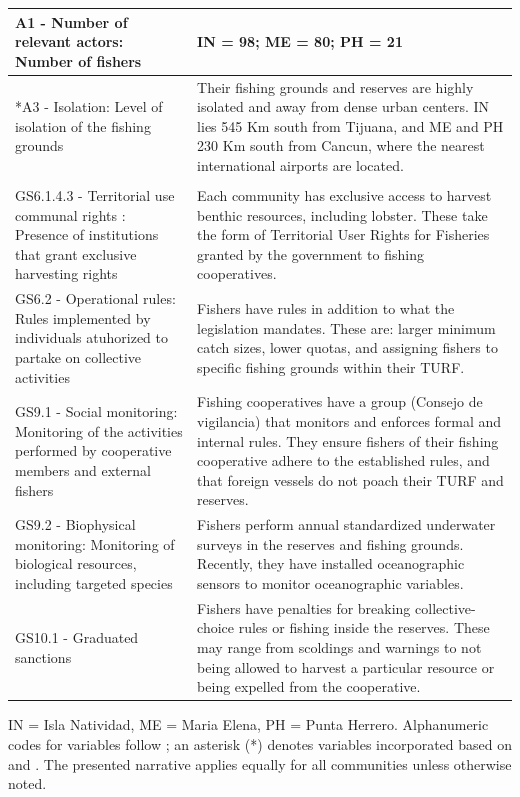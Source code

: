 \documentclass[10pt,letterpaper]{article}
\begin{document}
\begin{table}[!ht]
{\begin{tabular}{>{\raggedright\arraybackslash}p{6.5cm}|>{\raggedright\arraybackslash}p{12.2cm}}
\hline
\hspace{1em}A1 - Number of relevant actors: Number of fishers & IN = 98; ME = 80; PH = 21\\
\hline
\hspace{1em}*A3 - Isolation: Level of isolation of the fishing grounds & Their fishing grounds and reserves are highly isolated and away from dense urban centers. IN lies 545 Km south from Tijuana, and ME and PH 230 Km south from Cancun, where the nearest international airports are located.\\
\hline
\multicolumn{2}{l}{\textbf{Governance system (G)}}\\
\hline
\hspace{1em}GS6.1.4.3 - Territorial use communal rights : Presence of institutions that grant exclusive harvesting rights & Each community has exclusive access to harvest benthic resources, including lobster. These take the form of Territorial User Rights for Fisheries granted by the government to fishing cooperatives.\\
\hline
\hspace{1em}GS6.2 - Operational rules: Rules implemented by individuals atuhorized to partake on collective activities & Fishers have rules in addition to what the legislation mandates. These are: larger minimum catch sizes, lower quotas, and assigning fishers to specific fishing grounds within their TURF.\\
\hline
\hspace{1em}GS9.1 - Social monitoring: Monitoring of the activities performed by cooperative members and external fishers & Fishing cooperatives have a group (Consejo de vigilancia) that monitors and enforces formal and internal rules. They ensure fishers of their fishing cooperative adhere to the established rules, and that foreign vessels do not poach their TURF and reserves.\\
\hline
\hspace{1em}GS9.2 - Biophysical monitoring: Monitoring of biological resources, including targeted species & Fishers perform annual standardized underwater surveys in the reserves and fishing grounds. Recently, they have installed oceanographic sensors to monitor oceanographic variables.\\
\hline
GS10.1 - Graduated sanctions & Fishers have penalties for breaking collective-choice rules or fishing inside the reserves. These may range from scoldings and warnings to not being allowed to harvest a particular resource or being expelled from the cooperative.\\
\hline
\end{tabular}}
\label{table:ses}
IN = Isla Natividad, ME = Maria Elena, PH = Punta Herrero. Alphanumeric codes for variables follow \cite{basurto_2013-oq}; an asterisk (*) denotes variables incorporated based on \cite{difranco_2016-Xw} and \cite{edgar_2014-UO}. The presented narrative applies equally for all communities unless otherwise noted.
\end{table}
\end{document}
